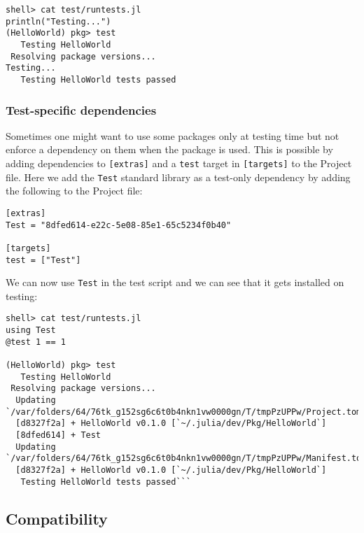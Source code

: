 \begin{lstlisting}
shell> cat test/runtests.jl
println("Testing...")
(HelloWorld) pkg> test
   Testing HelloWorld
 Resolving package versions...
Testing...
   Testing HelloWorld tests passed
\end{lstlisting}



\hypertarget{3762020746930282199}{}


\subsubsection{Test-specific dependencies}



Sometimes one might want to use some packages only at testing time but not enforce a dependency on them when the package is used. This is possible by adding dependencies to \texttt{[extras]} and a \texttt{test} target in \texttt{[targets]} to the Project file. Here we add the \texttt{Test} standard library as a test-only dependency by adding the following to the Project file:




\begin{lstlisting}
[extras]
Test = "8dfed614-e22c-5e08-85e1-65c5234f0b40"

[targets]
test = ["Test"]
\end{lstlisting}



We can now use \texttt{Test} in the test script and we can see that it gets installed on testing:




\begin{lstlisting}
shell> cat test/runtests.jl
using Test
@test 1 == 1

(HelloWorld) pkg> test
   Testing HelloWorld
 Resolving package versions...
  Updating `/var/folders/64/76tk_g152sg6c6t0b4nkn1vw0000gn/T/tmpPzUPPw/Project.toml`
  [d8327f2a] + HelloWorld v0.1.0 [`~/.julia/dev/Pkg/HelloWorld`]
  [8dfed614] + Test
  Updating `/var/folders/64/76tk_g152sg6c6t0b4nkn1vw0000gn/T/tmpPzUPPw/Manifest.toml`
  [d8327f2a] + HelloWorld v0.1.0 [`~/.julia/dev/Pkg/HelloWorld`]
   Testing HelloWorld tests passed```
\end{lstlisting}



\hypertarget{16280680646707854087}{}


\subsection{Compatibility}



